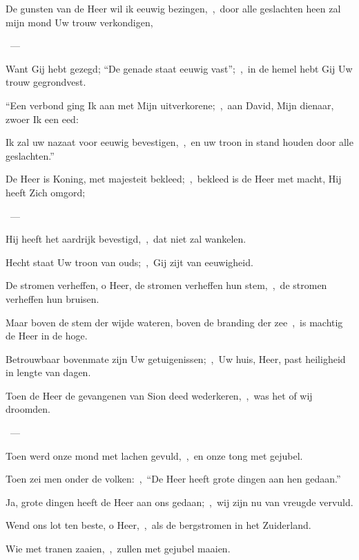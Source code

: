 \documentclass[12pt,twoside,a5paper]{article}
\begin{document}

\begin{halfparskip}
  De gunsten van de Heer wil ik eeuwig bezingen,~\sep\ door alle geslachten heen zal mijn mond Uw trouw verkondigen,

  ~--- 

  Want Gij hebt gezegd; ``De genade staat eeuwig vast'';~\sep\ in de hemel hebt Gij Uw trouw gegrondvest.

  ``Een verbond ging Ik aan met Mijn uitverkorene;~\sep\ aan David, Mijn dienaar, zwoer Ik een eed:

  Ik zal uw nazaat voor eeuwig bevestigen,~\sep\ en uw troon in stand houden door alle geslachten.''
\end{halfparskip}


\begin{halfparskip}
  De Heer is Koning, met majesteit bekleed;~\sep\ bekleed is de Heer met macht, Hij heeft Zich omgord;

  ~--- 

  Hij heeft het aardrijk bevestigd,~\sep\ dat niet zal wankelen.

  Hecht staat Uw troon van ouds;~\sep\ Gij zijt van eeuwigheid.

  De stromen verheffen, o Heer, de stromen verheffen hun stem,~\sep\ de stromen verheffen hun bruisen.

  Maar boven de stem der wijde wateren, boven de branding der zee~\sep\ is machtig de Heer in de hoge.

  Betrouwbaar bovenmate zijn Uw getuigenissen;~\sep\ Uw huis, Heer, past heiligheid in lengte van dagen.
\end{halfparskip}


\begin{halfparskip}
  Toen de Heer de gevangenen van Sion deed wederkeren,~\sep\ was het of wij droomden.

  ~--- 

  Toen werd onze mond met lachen gevuld,~\sep\ en onze tong met gejubel.

  Toen zei men onder de volken:~\sep\ ``De Heer heeft grote dingen aan hen gedaan.''

  Ja, grote dingen heeft de Heer aan ons gedaan;~\sep\ wij zijn nu van vreugde vervuld.

  Wend ons lot ten beste, o Heer,~\sep\ als de bergstromen in het Zuiderland.

  Wie met tranen zaaien,~\sep\ zullen met gejubel maaien.
\end{halfparskip}
\end{document}
